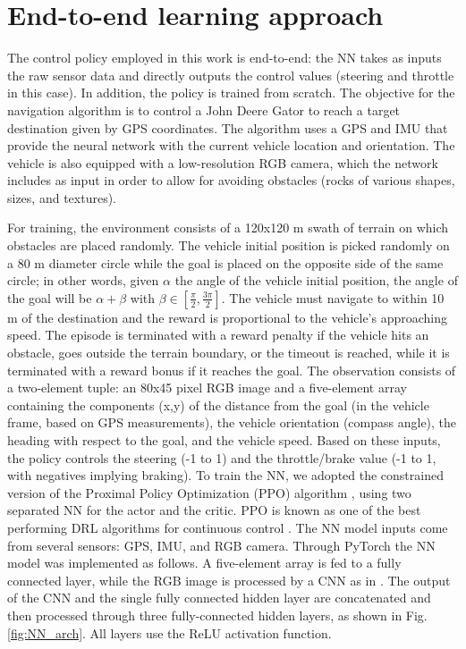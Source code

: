 

\section{End-to-end learning approach}
\label{sec:end2endLearning}

The control policy employed in this work is end-to-end: the NN takes as inputs the raw sensor data and directly outputs the control values (steering and throttle in this case). In addition, the policy is trained from scratch. The objective for the navigation algorithm is to control a John Deere Gator to reach a target destination given by GPS coordinates. The algorithm uses a GPS and IMU that provide the neural network with the current vehicle location and orientation. The vehicle is also equipped with a low-resolution RGB camera, which the network includes as input in order to allow for avoiding obstacles (rocks of various shapes, sizes, and textures).

For training, the environment consists of a 120x120 m swath of terrain on which obstacles are placed randomly. The vehicle initial position is picked randomly on a 80 m diameter circle while the goal is placed on the opposite side of the same circle; in other words, given $\alpha$ the angle of the vehicle initial position, the angle of the goal will be $\alpha + \beta$ with $\beta \in [\frac{\pi}{2} , \frac{3\pi}{2}]$.
The vehicle must navigate to within 10 m of the destination and the reward is proportional to the vehicle's approaching speed. The episode is terminated with a reward penalty if the vehicle hits an obstacle, goes outside the terrain boundary, or the timeout is reached, while it is terminated with a reward bonus if it reaches the goal.
The observation consists of a two-element tuple: an 80x45 pixel RGB image and a five-element array containing the components (x,y) of the distance from the goal (in the vehicle frame, based on GPS measurements), the vehicle orientation (compass angle), the heading with respect to the goal, and the vehicle speed. 
Based on these inputs, the policy controls the steering (-1 to 1) and the throttle/brake value (-1 to 1, with negatives implying braking). 
To train the NN, we adopted the constrained version of the Proximal Policy Optimization (PPO) algorithm \cite{Schulman2017PPO}, using two separated NN for the actor and the critic. PPO is known as one of the best performing DRL algorithms for continuous control \cite{openai2018HandManipulation}.
The NN model inputs come from several sensors: GPS, IMU, and RGB camera. Through PyTorch \cite{paszke2017PyTorch} the NN model was implemented as follows. A five-element array is fed to a fully connected layer, while the RGB image is processed by a CNN as in \cite{Mnih13}. The output of the CNN and the single fully connected hidden layer are concatenated and then processed through three fully-connected hidden layers, as shown in Fig. \ref{fig:NN_arch}. All layers use the ReLU activation function.

